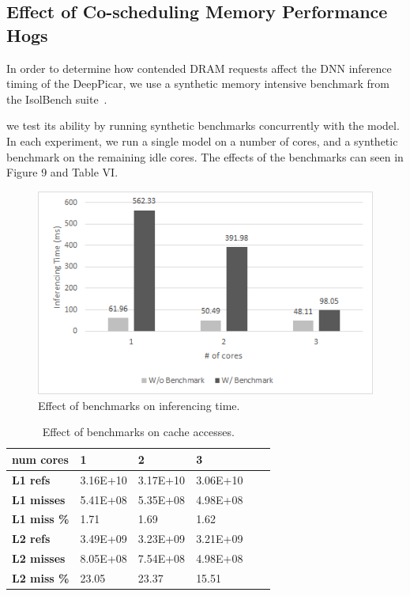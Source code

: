 
\subsection{Effect of Co-scheduling Memory Performance Hogs}

In order to determine how contended DRAM requests affect the DNN
inference timing of the DeepPicar, we use a synthetic memory
intensive benchmark from the IsolBench suite~\cite{Valsan2016}.

we test its ability by  running synthetic benchmarks
concurrently with the model. In each experiment, we run a single model
on a  number of cores, and a synthetic benchmark on the remaining idle
cores. The effects of the benchmarks can seen in Figure 9 and Table
VI. 

\begin{figure}[h]
  \centering
  \includegraphics[width=.5\textwidth]{figs/BenchmarkChart}
  \caption{ Effect of benchmarks on inferencing time. }
\end{figure}

\begin{table}[h]
\centering
  \begin{tabular} {| l | l | l | l | l | l |}
  \hline
  \textbf{num cores} & 1 & 2 & 3 \\ \hline
  \textbf{L1 refs} & 3.16E+10 & 3.17E+10 & 3.06E+10 \\ \hline
  \textbf{L1 misses} & 5.41E+08 & 5.35E+08 & 4.98E+08 \\ \hline
  \textbf{L1 miss \%} & 1.71 & 1.69 & 1.62 \\ \hline
  \textbf{L2 refs} & 3.49E+09 & 3.23E+09 & 3.21E+09 \\ \hline
  \textbf{L2 misses} & 8.05E+08 & 7.54E+08 & 4.98E+08 \\ \hline
  \textbf{L2 miss \%} & 23.05 & 23.37 & 15.51 \\ 
  \hline
  \end{tabular}
  \caption{ Effect of benchmarks on cache accesses. }
\end{table}

